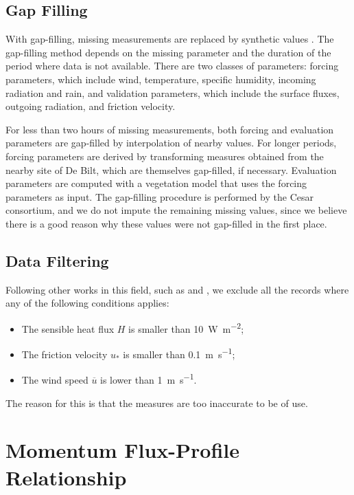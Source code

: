 \documentclass[a4paper,11pt]{kth-mag}
\begin{document}
\subsection{Gap Filling}
\label{sec:gap_filling}
With gap-filling, missing measurements are replaced by synthetic values \citep{cabauw_gapfilling}. The gap-filling method depends on the missing parameter and the duration of the period where data is not available. There are two classes of parameters: forcing parameters, which include wind, temperature, specific humidity, incoming radiation and rain, and validation parameters, which include the surface fluxes, outgoing radiation, and friction velocity.

For less than two hours of missing measurements, both forcing and evaluation parameters are gap-filled by interpolation of nearby values. For longer periods, forcing parameters are derived by transforming measures obtained from the nearby site of De Bilt, which are themselves gap-filled, if necessary. Evaluation parameters are computed with a vegetation model that uses the forcing parameters as input. The gap-filling procedure is performed by the Cesar consortium, and we do not impute the remaining missing values, since we believe there is a good reason why these values were not gap-filled in the first place.

\subsection{Data Filtering}
\label{sec:data_filter}
Following other works in this field, such as \cite{boulder} and \cite{hogstrom88}, we exclude all the records where any of the following conditions applies:

\begin{itemize}
\item The sensible heat flux $H$ is smaller than \SI{10}{\watt\per\square\meter};
\item The friction velocity $u_*$ is smaller than \SI{0.1}{\meter\per\second};
\item The wind speed $\overline{u}$ is lower than \SI{1}{\meter\per\second}.
\end{itemize}

The reason for this is that the measures are too inaccurate to be of use.


\section{Momentum Flux-Profile Relationship}
\label{sec:profiles}
\end{document}
